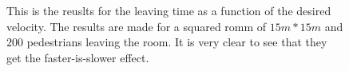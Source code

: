 \begin{figure}[h]
\centering
{}
\caption{This is the reuslts for the leaving time as a function of the desired velocity. The results are made for a squared romm of $15m*15m$ and $200$ pedestrians leaving the room. It is very clear to see that they get the faster-is-slower effect.}
\label{fig:LtNFasterIsSlower}
\end{figure}



